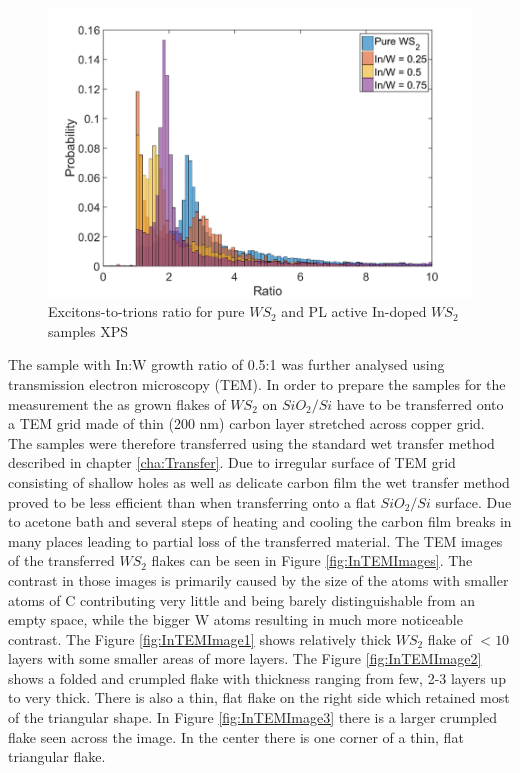 \begin{figure}[H]
	\begin{center}
		\includegraphics[scale=0.4]{In/PLRatioHistogram.png}
		\caption{Excitons-to-trions ratio for pure $WS_2$ and PL active In-doped $WS_2$ samples XPS}
		\label{fig:InPLRatioHistogram}
	\end{center}
\end{figure}


The sample with In:W growth ratio of 0.5:1 was further analysed using transmission electron microscopy (TEM). In order to prepare the samples for the measurement the as grown flakes of $WS_2$ on $SiO_2/Si$ have to be transferred onto a TEM grid made of thin (200 nm) carbon layer stretched across copper grid. The samples were therefore transferred using the standard wet transfer method described in chapter \ref{cha:Transfer}. Due to irregular surface of TEM grid consisting of shallow holes as well as delicate carbon film the wet transfer method proved to be less efficient than when transferring onto a flat $SiO_2/Si$ surface. Due to acetone bath and several steps of heating and cooling the carbon film breaks in many places leading to partial loss of the transferred material. The TEM images of the transferred $WS_2$ flakes can be seen in Figure \ref{fig:InTEMImages}. The contrast in those images is primarily caused by the size of the atoms with smaller atoms of C contributing very little and being barely distinguishable from an empty space, while the bigger W atoms resulting in much more noticeable contrast. The Figure \ref{fig:InTEMImage1} shows relatively thick $WS_2$ flake of $<10$ layers with some smaller areas of more layers. The Figure \ref{fig:InTEMImage2} shows a folded and crumpled flake with thickness ranging from few, 2-3 layers up to very thick. There is also a thin, flat flake on the right side which retained most of the triangular shape. In Figure \ref{fig:InTEMImage3} there is a larger crumpled flake seen across the image. In the center there is one corner of a thin, flat triangular flake.

